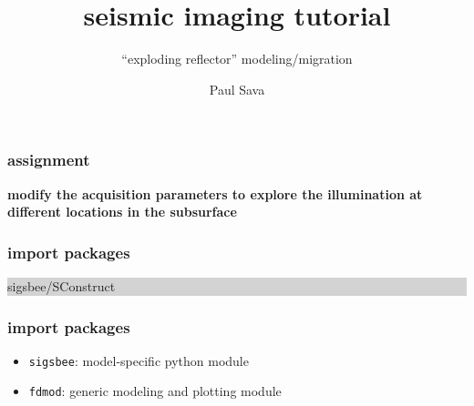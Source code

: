 
\title[]{seismic imaging tutorial}
\subtitle{``exploding reflector'' modeling/migration}
\author[]{Paul Sava}
\date{}
\large

\def\big#1{\begin{center} \LARGE \textbf{#1} \end{center}}
\def\cen#1{\begin{center}        \textbf{#1} \end{center}}

\def\graybox#1{
\vfill
\begin{center}
\colorbox{LightGray}
{\begin{minipage}{\columnwidth} {#1} \end{minipage}}
\end{center}
\vfill
}

 { \cwpcover }


\begin{frame} \frametitle{assignment}

\cen{modify the acquisition parameters to explore the illumination at
different locations in the subsurface}

\end{frame}
\cwpnote{}
\lstset{language=python,showstringspaces=false}

\begin{frame} \frametitle{import packages}
\graybox{
\normalsize 

		{sigsbee/SConstruct}
}
\end{frame}
\cwpnote{}

\begin{frame} \frametitle{import packages}
  \begin{itemize}
  \item \texttt{sigsbee}: model-specific python module
  \item \texttt{fdmod}: generic modeling and plotting module
  \end{itemize}
\end{frame}
\cwpnote{}

